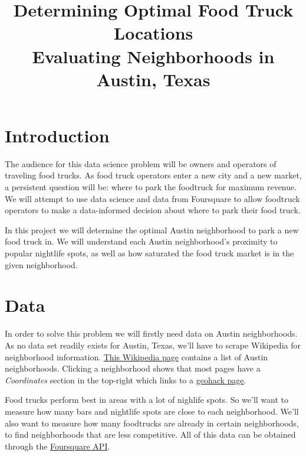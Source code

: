 \documentclass{deagle}
\title{Determining Optimal Food Truck Locations \\ \Large Evaluating Neighborhoods in Austin, Texas}
\begin{document}
\maketitle


\section*{Introduction}

The audience for this data science problem will be owners and operators of traveling food trucks. As food truck operators enter a new city and a new market, a persistent question will be: where to park the foodtruck for maximum revenue. We will attempt to use data science and data from Foursquare to allow foodtruck operators to make a data-informed decision about where to park their food truck.

In this project we will determine the optimal Austin neighborhood to park a new food truck in. We will understand each Austin neighborhood's proximity to popular nightlife spots, as well as how saturated the food truck market is in the given neighborhood.

\section*{Data}

In order to solve this problem we will firstly need data on Austin neighborhoods. As no data set readily exists for Austin, Texas, we'll have to scrape Wikipedia for neighborhood information. \href{https://en.wikipedia.org/wiki/Category:Neighborhoods_in_Austin,_Texas}{This Wikipedia page} contains a list of Austin neighborhoods. Clicking a neighborhood shows that most pages have a \emph{Coordinates} section in the top-right which links to a \href{https://geohack.toolforge.org/geohack.php?pagename=Anderson_Mill,_Austin,_Texas&params=30_27_18_N_97_48_33_W_region:US-TX_type:city(8953)}{geohack page}.

Food trucks perform best in areas with a lot of nighlife spots. So we'll want to measure how many bars and nightlife spots are close to each neighborhood. We'll also want to measure how many foodtrucks are already in certain neighborhoods, to find neighborhoods that are less competitive. All of this data can be obtained through the \href{https://foursquare.com/developers/apps}{Foursquare API}.
\end{document}

